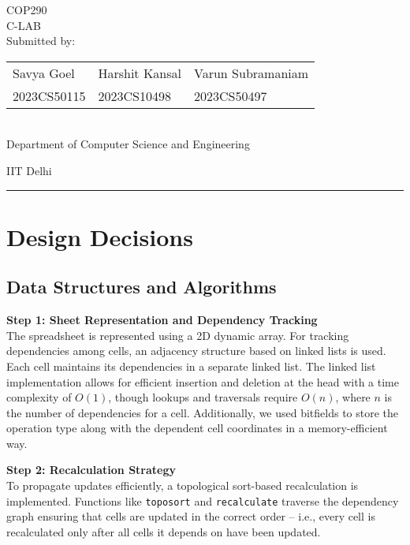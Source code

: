 \documentclass[12pt,letterpaper,onecolumn]{exam}
\begin{document}
\begingroup
    \centering
    \LARGE COP290\\
    \LARGE C-LAB\\[1em]
    \large Submitted by:\\[0.8em]
    \begin{tabular}{>{\centering\arraybackslash}m{4cm} >{\centering\arraybackslash}m{4cm} >{\centering\arraybackslash}m{5cm}}
        Savya Goel & Harshit Kansal & Varun Subramaniam \\
        2023CS50115 & 2023CS10498 & 2023CS50497
    \end{tabular}\\[1em]
    \large Department of Computer Science and Engineering\par
    \large IIT Delhi\par
\endgroup

\rule{\textwidth}{0.4pt}

\section{Design Decisions}

\subsection{Data Structures and Algorithms}

\noindent \textbf{Step 1: Sheet Representation and Dependency Tracking}\\
The spreadsheet is represented using a 2D dynamic array. For tracking dependencies among cells, an adjacency structure based on linked lists is used. Each cell maintains its dependencies in a separate linked list. The linked list implementation allows for efficient insertion and deletion at the head with a time complexity of \(O(1)\), though lookups and traversals require \(O(n)\), where \(n\) is the number of dependencies for a cell. Additionally, we used bitfields to store the operation type along with the dependent cell coordinates in a memory-efficient way.

\vspace{0.3cm}

\noindent \textbf{Step 2: Recalculation Strategy}\\
To propagate updates efficiently, a topological sort-based recalculation is implemented. Functions like \texttt{toposort} and \texttt{recalculate} traverse the dependency graph ensuring that cells are updated in the correct order -- i.e., every cell is recalculated only after all cells it depends on have been updated. 
\end{document}

